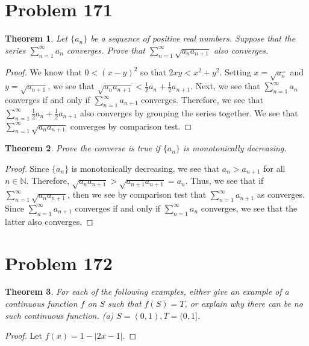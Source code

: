 \documentclass[psamsfonts]{amsart}
\newtheorem{thm}{Theorem}[section]
\theoremstyle{definition}
\theoremstyle{remark}
\numberwithin{equation}{section}
\begin{document}
\section{Problem 171}

\begin{thm}
Let $\{ a_n \}$ be a sequence of positive real numbers. Suppose that the series $\sum_{n=1}^\infty a_n $ converges. Prove that $\sum_{n=1}^\infty \sqrt{ a_n a_{n+1}}$ also converges. 
\end{thm}

\begin{proof}
We know that $0 < (x-y)^2$ so that $2xy < x^2 + y^2$. Setting $x = \sqrt{a_n}$ and $y = \sqrt{a_{n+1}}$, we see that $\sqrt{a_n a_{n+1}} < \frac{1}{2} a_n + \frac{1}{2} a_{n+1}$. Next, we see that $\sum_{n=1}^\infty a_n$ converges if and only if $\sum_{n=1}^\infty a_{n+1}$ converges. Therefore, we see that $\sum_{n=1}^\infty \frac{1}{2} a_n + \frac{1}{2} a_{n+1}$ also converges by grouping the series together. We see that $\sum_{n=1}^\infty \sqrt{a_n a_{n+1}}$ converges by comparison test.
\end{proof}

\begin{thm}
Prove the converse is true if $\{ a_n \}$ is monotonically decreasing. 
\end{thm}

\begin{proof}
Since $\{a_n \}$ is monotonically decreasing, we see that $a_n > a_{n+1}$ for all $n \in \mathbb{N}$. Therefore, $\sqrt{a_n a_{n+1}} > \sqrt{a_{n+1} a_{n+1}} = a_n$. Thus, we see that if $\sum_{n=1}^\infty \sqrt{a_n a_{n+1}}$, then we see by comparison test that $\sum_{n=1}^\infty a_{n+1}$ as converges. Since $\sum_{n=1}^\infty a_{n+1}$ converges if and only if $\sum_{n=1}^\infty a_n$ converges, we see that the latter also converges.
\end{proof}

\section{Problem 172}

\begin{thm}
For each of the following examples, either give an example of a continuous function $f$ on $S$ such that $f(S) = T$, or explain why there can be no such continuous function. (a) $S = (0,1), T = (0,1]$. 
\end{thm}

\begin{proof}
Let $f(x) = 1 - |2x - 1|$. 
\end{proof}
\end{document}
